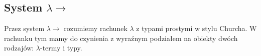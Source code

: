 \subsection{System \(\lambda\to\)}
Przez system \(\lambda\to\) rozumiemy rachunek \(\lambda\)  z typami prostymi w stylu Churcha.
W rachunku tym mamy do czynienia z wyraźnym podziałem na obiekty dwóch rodzajów: \(\lambda\)-termy i typy.
